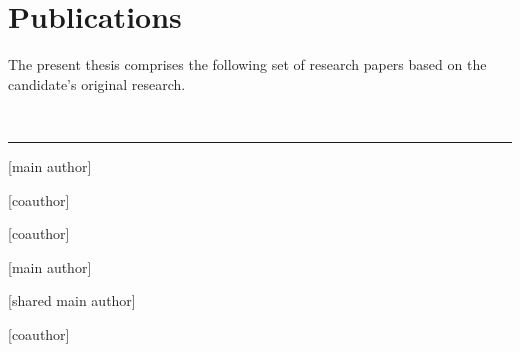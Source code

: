 
\chapter[publications]{Publications}

\newcommand{\main}{{\color{paper_main}[main author]}}
\newcommand{\shared}{{\color{paper_shared}[shared main author]}}
\newcommand{\co}{{\color{paper_co}[coauthor]}}

The present thesis comprises the following set of research papers based on the candidate's original research. 

\vspace{5mm}

\raggedright\par\noindent\hspace{8mm}{\Large\scshape primary}\\[-2mm]

\raggedleft\rule{\textwidth - 8mm}{0.4pt}

\begin{enumerate}[leftmargin=8mm,topsep=0mm,label={[\Alph*]}]
    \item {} \main \label{enumerate: paper-hierarchical}
    \item {} \co \label{enumerate: paper-modelagnostic}
    \item {} \co \label{enumerate: paper-brief}
    \item {} \main \label{enumerate: paper-benchmarking}
    \item {} \shared \label{enumerate: paper-retrospective}
    \item {} \co \label{enumerate: paper-automated}
\end{enumerate}




